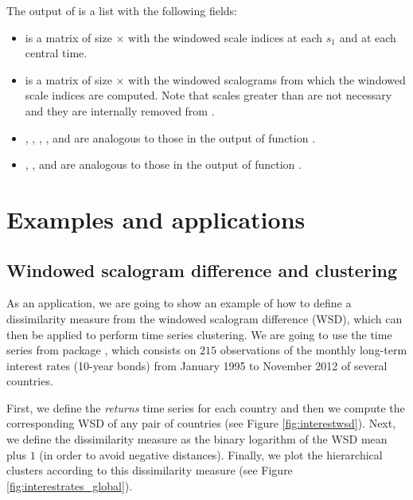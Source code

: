The output of  is a list with the following fields:
\begin{itemize}
\item {} is a matrix of size $\times $ with the windowed scale indices at each $s_1$ and at each central time.
\item {} is a matrix of size $\times $ with the windowed scalograms from which the windowed scale indices are computed. Note that scales greater than  are not necessary and they are internally removed from .
\item {}, , , ,  and  are analogous to those in the output of function .
\item {}, ,  and  are analogous to those in the output of function .
\end{itemize}

\section{Examples and applications}
\label{sec6} 

\subsection{Windowed scalogram difference and clustering}

As an application, we are going to show an example of how to define a dissimilarity measure from the windowed scalogram difference (WSD), which can then be applied to perform time series clustering. We are going to use the  time series from package  \citep{jss14}, which consists on $215$ observations of the monthly long-term interest rates (10-year bonds) from January 1995 to November 2012 of several countries.

First, we define the \emph{returns} time series for each country and then we compute the corresponding WSD of any pair of countries (see Figure \ref{fig:interestwsd}). Next, we define the dissimilarity measure as the binary logarithm of the WSD mean plus $1$ (in order to avoid negative distances).
Finally, we plot the hierarchical clusters according to this dissimilarity measure (see Figure \ref{fig:interestrates_global}).

